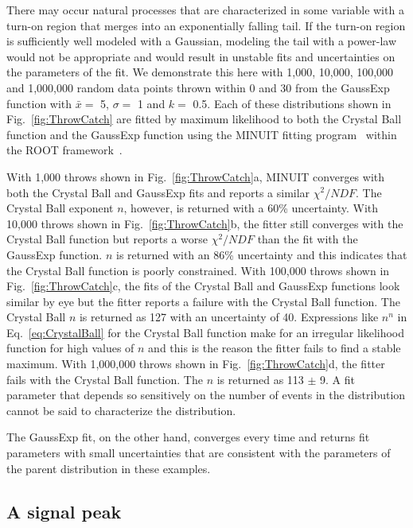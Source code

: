 \documentclass[10pt,letterpaper]{article}
\begin{document}
There may occur natural processes that are characterized in some variable with a turn-on region that merges into an exponentially falling tail. If the turn-on region is sufficiently well modeled with a Gaussian, modeling the tail with a power-law would not be appropriate and would result in unstable fits and uncertainties on the parameters of the fit. We demonstrate this here with 1,000, 10,000, 100,000 and 1,000,000 random data points thrown within 0 and 30 from the GaussExp function with $\bar{x} =$ 5, $\sigma =$ 1 and $k =$ 0.5. Each of these distributions shown in Fig.~\ref{fig:ThrowCatch} are fitted by maximum likelihood to both the Crystal Ball function and the GaussExp function using the MINUIT fitting program~\cite{JAMES1975343} within the ROOT framework~\cite{Antcheva20092499}.

With 1,000 throws shown in Fig.~\ref{fig:ThrowCatch}a, MINUIT converges with both the Crystal Ball and GaussExp fits and reports a similar $\chi^2/NDF$. The Crystal Ball exponent $n$, however, is returned with a 60\% uncertainty. With 10,000 throws shown in Fig.~\ref{fig:ThrowCatch}b, the fitter still converges with the Crystal Ball function but reports a worse $\chi^2/NDF$ than the fit with the GaussExp function. $n$ is returned with an 86\% uncertainty and this indicates that the Crystal Ball function is poorly constrained. With 100,000 throws shown in Fig.~\ref{fig:ThrowCatch}c, the fits of the Crystal Ball and GaussExp functions look similar by eye but the fitter reports a failure with the Crystal Ball function. The Crystal Ball $n$ is returned as 127 with an uncertainty of 40. Expressions like $n^n$ in Eq.~\ref{eq:CrystalBall} for the Crystal Ball function make for an irregular likelihood function for high values of $n$ and this is the reason the fitter fails to find a stable maximum. With 1,000,000 throws shown in Fig.~\ref{fig:ThrowCatch}d, the fitter fails with the Crystal Ball function. The $n$ is returned as 113 $\pm$ 9. A fit parameter that depends so sensitively on the number of events in the distribution cannot be said to characterize the distribution. 

The GaussExp fit, on the other hand, converges every time and returns fit parameters with small uncertainties that are consistent with the parameters of the parent distribution in these examples.

\subsection{A signal peak}
\end{document}
